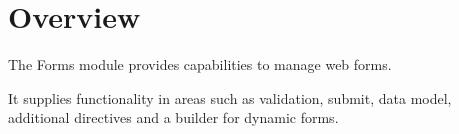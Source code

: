\section{Overview}

The Forms module  provides capabilities to manage web forms.

It supplies functionality in areas such as validation, submit, data model, additional
directives and a builder for dynamic forms.
